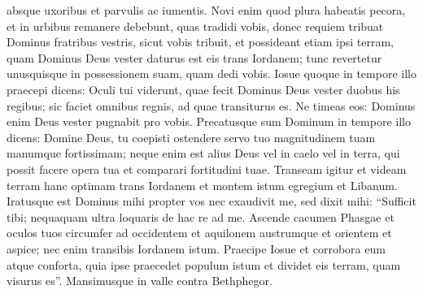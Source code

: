 \begin{biblechapter}
\begin{biblechapter}
\begin{biblechapter}
\verse absque uxoribus et parvulis ac iumentis. Novi enim quod plura habeatis pecora, et in urbibus remanere debebunt, quas tradidi vobis, 
 \verse donec requiem tribuat Dominus fratribus vestris, sicut vobis tribuit, et possideant etiam ipsi terram, quam Dominus Deus vester daturus est eis trans Iordanem; tunc revertetur unusquisque in possessionem suam, quam dedi vobis.
 \verse Iosue quoque in tempore illo praecepi dicens: Oculi tui viderunt, quae fecit Dominus Deus vester duobus his regibus; sic faciet omnibus regnis, ad quae transiturus es. 
\verse Ne timeas eos: Dominus enim Deus vester pugnabit pro vobis.
 \verse Precatusque sum Dominum in tempore illo dicens: 
\verse Domine Deus, tu coepisti ostendere servo tuo magnitudinem tuam manumque fortissimam; neque enim est alius Deus vel in caelo vel in terra, qui possit facere opera tua et comparari fortitudini tuae. 
\verse Transeam igitur et videam terram hanc optimam trans Iordanem et montem istum egregium et Libanum. 
\verse Iratusque est Dominus mihi propter vos nec exaudivit me, sed dixit mihi: “Sufficit tibi; nequaquam ultra loquaris de hac re ad me. 
\verse Ascende cacumen Phasgae et oculos tuos circumfer ad occidentem et aquilonem austrumque et orientem et aspice; nec enim transibis Iordanem istum. 
\verse Praecipe Iosue et corrobora eum atque conforta, quia ipse praecedet populum istum et dividet eis terram, quam visurus es”.
 \verse Mansimusque in valle contra Bethphegor.
 

\end{biblechapter}
\end{biblechapter}
\end{biblechapter}
